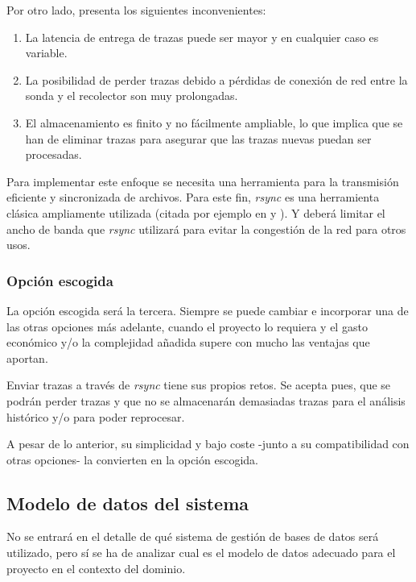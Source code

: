 Por otro lado, presenta los siguientes inconvenientes:

\begin{enumerate}
    \item La latencia de entrega de trazas puede ser mayor y en cualquier caso es variable.
    \item La posibilidad de perder trazas debido a pérdidas de conexión de red entre la sonda y el recolector son muy prolongadas.
    \item El almacenamiento es finito y no fácilmente ampliable, lo que implica que se han de eliminar trazas para asegurar que las trazas nuevas puedan
    ser procesadas.
\end{enumerate}

Para implementar este enfoque se necesita una herramienta para la transmisión eficiente y sincronizada de archivos. Para este fin,
\emph{rsync} es una herramienta clásica ampliamente utilizada (citada por ejemplo en \cite{Ph.D.200301} y \cite{douglis2004web}). Y deberá limitar el ancho de banda que \emph{rsync} utilizará para evitar la congestión de la red para otros usos.

\subsubsection{Opción escogida}

La opción escogida será la tercera. Siempre se puede cambiar e incorporar una de las otras opciones más adelante, cuando el proyecto lo requiera y el gasto económico
y/o la complejidad añadida supere con mucho las ventajas que aportan.

Enviar trazas a través de \emph{rsync} tiene sus propios retos. Se acepta pues, que se podrán perder trazas y que no se almacenarán
demasiadas trazas para el análisis histórico y/o para poder reprocesar.

A pesar de lo anterior, su simplicidad y bajo coste -junto a su compatibilidad con otras opciones- la convierten en la opción escogida.

\subsection{Modelo de datos del sistema}

No se entrará en el detalle de qué sistema de gestión de bases de datos será utilizado, pero sí  se ha de analizar cual es el modelo de datos
adecuado para el proyecto en el contexto del dominio.

